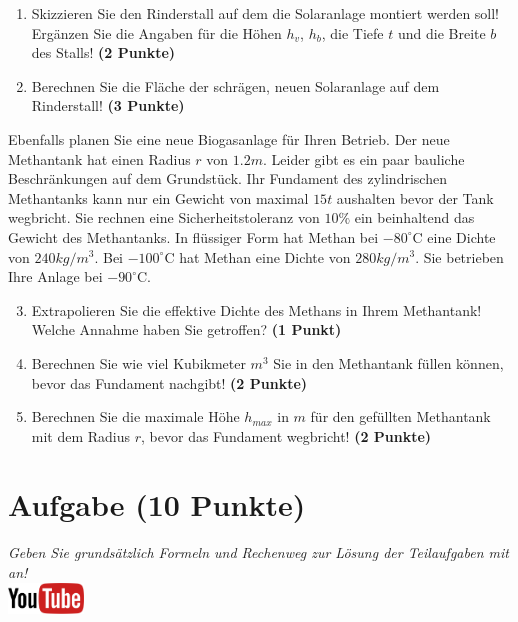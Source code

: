 \documentclass[a4paper, 9pt]{scrartcl}\usepackage[]{graphicx}\usepackage[]{xcolor}
\begin{document}
\begin{enumerate}
\item Skizzieren Sie den Rinderstall auf dem die Solaranlage montiert
  werden soll! Erg{\"a}nzen Sie die Angaben f{\"u}r die H{\"o}hen $h_v$, $h_b$, die
  Tiefe $t$ und die Breite $b$ des Stalls!  \textbf{(2 Punkte)}
\item Berechnen Sie die Fl{\"a}che der schr{\"a}gen, neuen Solaranlage auf dem
  Rinderstall! \textbf{(3 Punkte)}
\end{enumerate}

Ebenfalls planen Sie eine neue Biogasanlage f{\"u}r Ihren Betrieb. Der neue
Methantank hat einen Radius $r$ von $1.2m$. Leider gibt es ein
paar bauliche Beschr{\"a}nkungen auf dem Grundst{\"u}ck. Ihr Fundament des
zylindrischen Methantanks kann nur ein Gewicht von maximal
$15t$ aushalten bevor der Tank wegbricht. Sie rechnen eine
Sicherheitstoleranz von $10\%$ ein beinhaltend das Gewicht des
Methantanks. In fl{\"u}ssiger Form hat
Methan bei $-80^\circ\text{C}$ eine Dichte von
$240kg/m^3$. Bei $-100^\circ\text{C}$ hat Methan eine Dichte
von $280kg/m^3$. Sie betrieben Ihre Anlage bei
$-90^\circ\text{C}$.

\begin{enumerate}
  \setcounter{enumi}{2}
\item Extrapolieren Sie die effektive Dichte des Methans in Ihrem
  Methantank! Welche Annahme haben Sie getroffen? \textbf{(1 Punkt)}
\item Berechnen Sie wie viel Kubikmeter $m^3$ Sie in den Methantank f{\"u}llen
  k{\"o}nnen, bevor das Fundament nachgibt! \textbf{(2 Punkte)}
\item Berechnen Sie die maximale H{\"o}he $h_{max}$ in $m$ f{\"u}r den gef{\"u}llten
  Methantank mit dem Radius $r$, bevor das Fundament wegbricht! \textbf{(2
    Punkte)}
\end{enumerate}

 
\clearpage

\section{Aufgabe \hfill (10 Punkte)}

\textit{Geben Sie grunds{\"a}tzlich Formeln und Rechenweg zur L{\"o}sung der
  Teilaufgaben mit an!} \\[1Ex]

\hfill\href{https://youtu.be/https://youtu.be/k2G52hMIfqk}{\includegraphics[width = 2cm]{img/youtube}} %
\hspace{2Ex}
\end{document}
